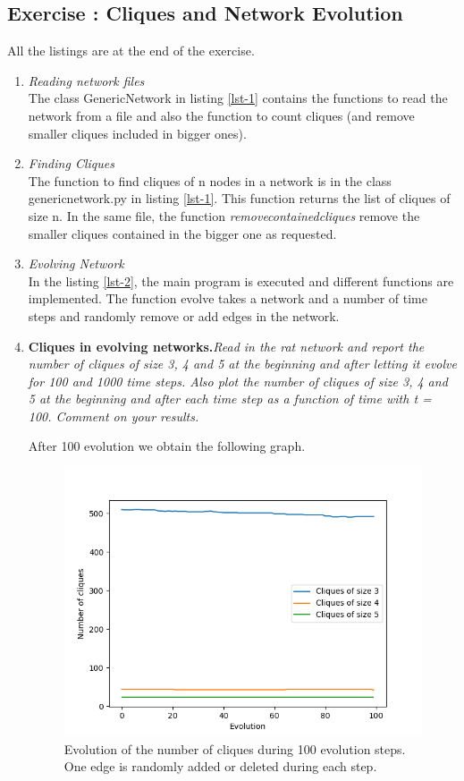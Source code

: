 \documentclass[10pt,a4paper]{article}
\newcommand{\exercise}[1]
{
  \stepcounter{subsection}
  \subsection*{Exercise \thesubsection: #1}

}
\begin{document}
\exercise{Cliques and Network Evolution}
All the listings are at the end of the exercise. 
\begin{enumerate}

\item \textit{Reading network files}\\ 
The class GenericNetwork in listing \ref{lst-1} contains the functions to read the network from a file and also the function to count cliques (and remove smaller cliques included in bigger ones).


\item \textit{Finding Cliques}\\

The function to find cliques of n nodes in a network is in the class generic\textunderscore network.py in listing \ref{lst-1}. This function returns the list of cliques of size n. In the same file, the function \textit{remove\textunderscore contained\textunderscore cliques} remove the smaller cliques contained in the bigger one as requested.  



\item \textit{Evolving Network}\\

In the listing \ref{lst-2}, the main program is executed and different functions are implemented. The function evolve takes a network and a number of time steps and randomly remove or add edges in the network. 



\item \textbf{Cliques in evolving networks.}\textit{Read in the rat network and report the number of cliques of size 3, 4 and 5 at the beginning and after letting it evolve for 100 and 1000 time steps. Also plot the number of cliques of size 3, 4 and 5 at the beginning and after each time step as a function of time with t = 100. Comment on your results.}

After 100 evolution we obtain the following graph.

\begin{figure}[H]
	\centering
	\includegraphics[width=0.7\linewidth]{img/100randomRatNetwork}
	\caption{Evolution of the number of cliques during 100 evolution steps. One edge is randomly added or deleted during each step.}
	\label{fig:100randomratnetwork}
\end{figure}


\end{enumerate}
\end{document}
